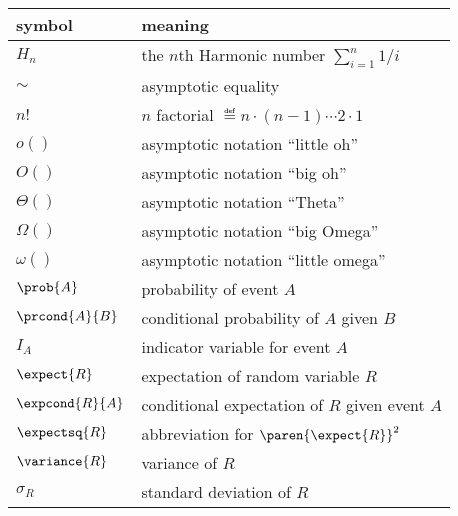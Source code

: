 \begin{center}
\begin{tabular}{ll}
symbol         &  meaning\\
\hline
$H_n$          & the $n$th Harmonic number $\sum_{i=1}^n 1/i$\\
$\sim$         & asymptotic equality\\
$n!$           & $n$ factorial $\eqdef n \cdot (n-1) \cdots 2 \cdot 1$\\
$o()$          & asymptotic notation ``little oh''\\
$O()$          & asymptotic notation ``big oh''\\
$\Theta()$     & asymptotic notation ``Theta''\\
$\Omega()$     & asymptotic notation ``big Omega''\\
$\omega()$     & asymptotic notation ``little omega''\\
$\prob{A}$     & probability of event $A$\\
$\prcond{A}{B}$ & conditional probability of $A$ given $B$\\
$I_A$          & indicator variable for event $A$\\
$\expect{R}$   & expectation of random variable $R$\\
$\expcond{R}{A}$ & conditional expectation of $R$ given event $A$\\
$\expectsq{R}$   & abbreviation for $\paren{\expect{R}}^2$\\
$\variance{R}$ & variance of $R$\\
$\sigma_R$     & standard deviation of $R$
\end{tabular}
\end{center}

